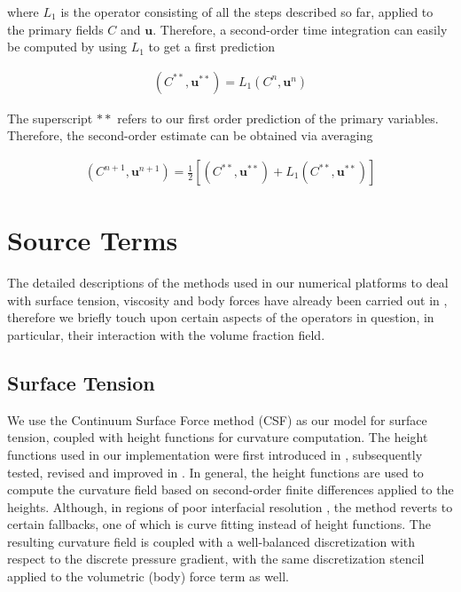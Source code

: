where $L_{1}$ is the operator consisting of all the steps described 
so far, applied to the primary fields $C$ and $\boldsymbol{u}$. 
Therefore, a second-order time integration can easily be 
computed by using $L_{1}$ to get a first prediction    

\begin{align}
\left(C^{**},\boldsymbol{u}^{**}\right) = L_{1}\left( C^{n},\boldsymbol{u}^{n} \right)
\end{align}

The superscript $**$ refers to our first order prediction of the primary variables. 
Therefore, the second-order estimate can be obtained via averaging   

\begin{align}
\left(C^{n+1},\boldsymbol{u}^{n+1}\right) = \frac{1}{2}\left[ \left(C^{**},\boldsymbol{u}^{**} \right) + L_{1}\left( C^{**},\boldsymbol{u}^{**} \right) \right]
\end{align}


\section{Source Terms}
The detailed descriptions of the methods used in our numerical platforms to deal with surface tension,
viscosity and body forces have already been carried out in \cite{paris, basilisk, popinet2009accurate}, 
therefore we briefly touch upon certain aspects of the operators in question, in particular, 
their interaction with the volume fraction field.

\subsection*{Surface Tension}
We use the Continuum Surface Force method (CSF) as our model for surface tension, 
coupled with height functions for curvature computation. 
The height functions used in our implementation were first introduced in \cite{popinet2009accurate}
, subsequently tested, revised and improved in \cite{bornia2011properties,owkes2015mesh}. 
In general, the height functions are used to compute the curvature field based 
on second-order finite differences applied to the heights. 
Although, in regions of poor interfacial resolution 
, 
the method reverts to certain fallbacks, one of which is curve fitting instead of height functions.  
The resulting curvature field is coupled with a well-balanced discretization with
respect to the discrete pressure gradient, with the same discretization 
stencil applied to the volumetric (body) force term as well. 


